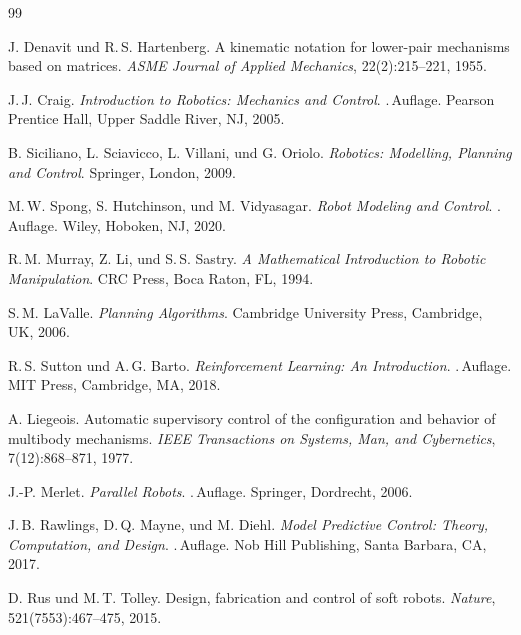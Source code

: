 ﻿\documentclass[a4paper,12pt]{article}
\theoremstyle{definition}
\begin{document}
\begin{thebibliography}{99}

J. Denavit und R.\,S. Hartenberg.
\newblock A kinematic notation for lower-pair mechanisms based on matrices.
\newblock \emph{ASME Journal of Applied Mechanics}, 22(2):215--221, 1955.

J.\,J. Craig.
\newblock \emph{Introduction to Robotics: Mechanics and Control}.
.\,Auflage. Pearson Prentice Hall, Upper Saddle River, NJ, 2005.

B. Siciliano, L. Sciavicco, L. Villani, und G. Oriolo.
\newblock \emph{Robotics: Modelling, Planning and Control}.
\newblock Springer, London, 2009.

M.\,W. Spong, S. Hutchinson, und M. Vidyasagar.
\newblock \emph{Robot Modeling and Control}.
.\,Auflage. Wiley, Hoboken, NJ, 2020.

R.\,M. Murray, Z. Li, und S.\,S. Sastry.
\newblock \emph{A Mathematical Introduction to Robotic Manipulation}.
\newblock CRC Press, Boca Raton, FL, 1994.

S.\,M. LaValle.
\newblock \emph{Planning Algorithms}.
\newblock Cambridge University Press, Cambridge, UK, 2006.

R.\,S. Sutton und A.\,G. Barto.
\newblock \emph{Reinforcement Learning: An Introduction}.
.\,Auflage. MIT Press, Cambridge, MA, 2018.

A. Liegeois.
\newblock Automatic supervisory control of the configuration and behavior of
  multibody mechanisms.
\newblock \emph{IEEE Transactions on Systems, Man, and Cybernetics},
  7(12):868--871, 1977.

J.-P. Merlet.
\newblock \emph{Parallel Robots}.
.\,Auflage. Springer, Dordrecht, 2006.

J.\,B. Rawlings, D.\,Q. Mayne, und M. Diehl.
\newblock \emph{Model Predictive Control: Theory, Computation, and Design}.
.\,Auflage. Nob Hill Publishing, Santa Barbara, CA, 2017.

D. Rus und M.\,T. Tolley.
\newblock Design, fabrication and control of soft robots.
\newblock \emph{Nature}, 521(7553):467--475, 2015.


\end{thebibliography}
\end{document}
